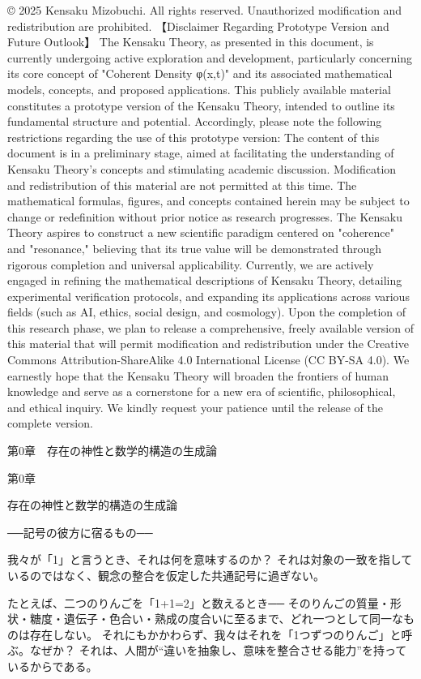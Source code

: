 \documentclass{article}
\begin{document}
© 2025 Kensaku Mizobuchi. All rights reserved. Unauthorized modification and redistribution are prohibited.
【Disclaimer Regarding Prototype Version and Future Outlook】
The Kensaku Theory, as presented in this document, is currently undergoing active exploration and development, particularly concerning its core concept of "Coherent Density φ(x,t)" and its associated mathematical models, concepts, and proposed applications. This publicly available material constitutes a prototype version of the Kensaku Theory, intended to outline its fundamental structure and potential.
Accordingly, please note the following restrictions regarding the use of this prototype version:
The content of this document is in a preliminary stage, aimed at facilitating the understanding of Kensaku Theory's concepts and stimulating academic discussion.
Modification and redistribution of this material are not permitted at this time.
The mathematical formulas, figures, and concepts contained herein may be subject to change or redefinition without prior notice as research progresses.
The Kensaku Theory aspires to construct a new scientific paradigm centered on "coherence" and "resonance," believing that its true value will be demonstrated through rigorous completion and universal applicability.
Currently, we are actively engaged in refining the mathematical descriptions of Kensaku Theory, detailing experimental verification protocols, and expanding its applications across various fields (such as AI, ethics, social design, and cosmology). Upon the completion of this research phase, we plan to release a comprehensive, freely available version of this material that will permit modification and redistribution under the Creative Commons Attribution-ShareAlike 4.0 International License (CC BY-SA 4.0).
We earnestly hope that the Kensaku Theory will broaden the frontiers of human knowledge and serve as a cornerstone for a new era of scientific, philosophical, and ethical inquiry. We kindly request your patience until the release of the complete version.


第0章　存在の神性と数学的構造の生成論



第0章

存在の神性と数学的構造の生成論

──記号の彼方に宿るもの──

我々が「1」と言うとき、それは何を意味するのか？
それは対象の一致を指しているのではなく、観念の整合を仮定した共通記号に過ぎない。

たとえば、二つのりんごを「1+1=2」と数えるとき──
そのりんごの質量・形状・糖度・遺伝子・色合い・熟成の度合いに至るまで、どれ一つとして同一なものは存在しない。
それにもかかわらず、我々はそれを「1つずつのりんご」と呼ぶ。なぜか？
それは、人間が“違いを抽象し、意味を整合させる能力”を持っているからである。
\end{document}
